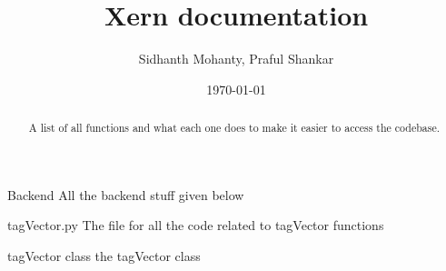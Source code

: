 \documentclass[11pt]{article}
\begin{document}
\title{Xern documentation}
\author{Sidhanth Mohanty, Praful Shankar}
\date{\today}
\maketitle

\begin{abstract}
	A list of all functions and what each one does to make it
	easier to access the codebase.
\end{abstract}

\tableofcontents

\eject

\begin{section}{Backend}
All the backend stuff given below
\end{section}
\begin{section}{tagVector.py}
The file for all the code related to tagVector functions
\end{section}
\begin{section}{tagVector class}
the tagVector class
\end{section}
\end{document}
